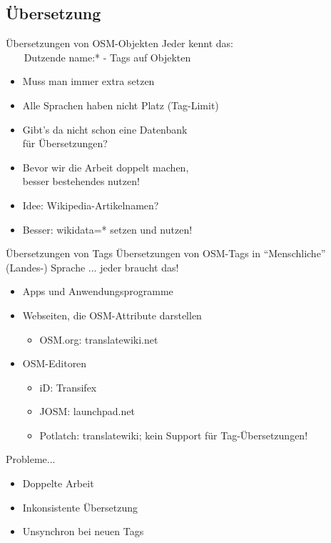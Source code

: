 \documentclass{beamer}
\begin{document}
\subsection{Übersetzung}

{
\begin{frame}{Übersetzungen von OSM-Objekten}
      Jeder kennt das: \\ 
      ~~~ Dutzende name:* - Tags auf Objekten \pause
      \begin{itemize}
        \item Muss man immer extra setzen
        \item Alle Sprachen haben nicht Platz (Tag-Limit)
        \item Gibt's da nicht schon eine Datenbank \\ für Übersetzungen?
        \item Bevor wir die Arbeit doppelt machen, \\ besser bestehendes nutzen! \pause
        \item Idee: Wikipedia-Artikelnamen? \pause
 \vspace*{0.2cm}
        \item Besser: wikidata=* setzen und nutzen! 
      \end{itemize}

\end{frame}
}

\begin{frame}{Übersetzungen von Tags}
  Übersetzungen von OSM-Tags in "`Menschliche"' (Landes-) Sprache ... jeder braucht das!
  \begin{itemize}
    \item Apps und Anwendungsprogramme \pause
    \item Webseiten, die OSM-Attribute darstellen 
      \begin{itemize}
        \item OSM.org: translatewiki.net
      \end{itemize}
      \pause
    \item OSM-Editoren
      \begin{itemize}
        \item iD: Transifex
        \item JOSM: launchpad.net
        \item Potlatch: translatewiki; kein Support für Tag-Übersetzungen!
      \end{itemize}
  \end{itemize}

  Probleme...
  \pause
  \begin{itemize}
    \item Doppelte Arbeit
    \item Inkonsistente Übersetzung
    \item Unsynchron bei neuen Tags
  \end{itemize}

\end{frame}
\end{document}
